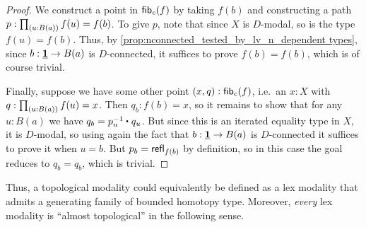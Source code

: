\begin{proof}
  We construct a point in $\mathsf{fib}_{c}(f)$ by taking $f(b)$ and constructing a path $p:\prd{u:B(a)} f(u)=f(b)$.
  To give $p$, note that since $X$ is $D$-modal, so is the type $f(u)=f(b)$.
  Thus, by \cref{prop:nconnected_tested_by_lv_n_dependent types}, since $b:\underline{\mathbf{1}}\to B(a)$ is $D$-connected, it suffices to prove $f(b)=f(b)$, which is of course trivial.

  Finally, suppose we have some other point $(x,q) : \mathsf{fib}_{c}(f)$, i.e.\ an $x:X$ with $q:\prd{u:B(a)} f(u)=x$.
  Then $q_b : f(b) = x$, so it remains to show that for any $u:B(a)$ we have $q_b = \ct{p_u^{-1}}{q_u}$.
  But since this is an iterated equality type in $X$, it is $D$-modal, so using again the fact that $b:\underline{\mathbf{1}}\to B(a)$ is $D$-connected it suffices to prove it when $u=b$.
  But $p_b = \mathsf{refl}_{f(b)}$ by definition, so in this case the goal reduces to $q_b = q_b$, which is trivial.
\end{proof}

Thus, a topological modality could equivalently be defined as a lex modality that admits a generating family of bounded homotopy type.
Moreover, \emph{every} lex modality is ``almost topological'' in the following sense.

